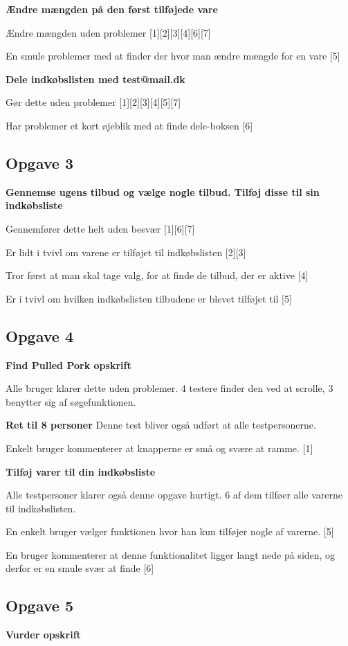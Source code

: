\textbf{Ændre mængden på den først tilføjede vare}

Ændre mængden uden problemer [1][2][3][4][6][7]

En smule problemer med at finder der hvor man ændre mængde for en vare [5]

\textbf{Dele indkøbslisten med test@mail.dk}

Gør dette uden problemer [1][2][3][4][5][7]

Har problemer et kort øjeblik med at finde dele-boksen [6] 

\subsection{Opgave 3} 
\textbf{Gennemse ugens tilbud og vælge nogle tilbud. Tilføj disse til sin indkøbsliste}

Gennemfører dette helt uden besvær [1][6][7]

Er lidt i tvivl om varene er tilføjet til indkøbslisten [2][3]

Tror først at man skal tage valg, for at finde de tilbud, der er aktive [4]

Er i tvivl om hvilken indkøbslisten tilbudene er blevet tilføjet til [5]

\subsection{Opgave 4}
\textbf{Find Pulled Pork opskrift}

Alle bruger klarer dette uden problemer.
4 testere finder den ved at scrolle, 3 benytter sig af søgefunktionen.

\textbf{Ret til 8 personer}
Denne test bliver også udført at alle testpersonerne. 

Enkelt bruger kommenterer at knapperne er små og svære at ramme. [1]

\textbf{Tilføj varer til din indkøbsliste}

Alle testpersoner klarer også denne opgave hurtigt. 
6 af dem tilføer alle varerne til indkøbslisten.

En enkelt bruger vælger funktionen hvor han kun tilføjer nogle af varerne. [5]

En bruger kommenterer at denne funktionalitet ligger langt nede på siden, og derfor er en smule svær at finde [6]

\subsection{Opgave 5}
\textbf{Vurder opskrift}

